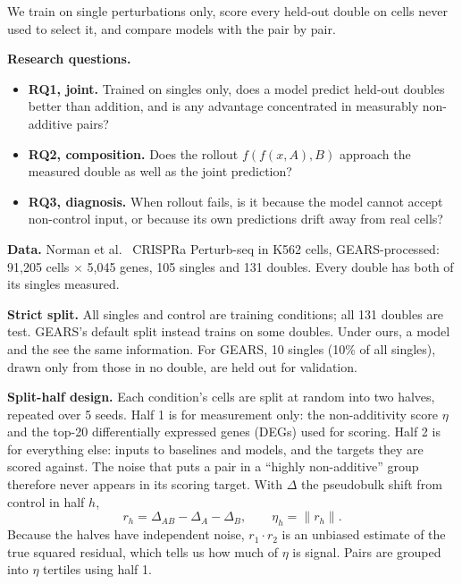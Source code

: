 We train on single perturbations only, score every held-out double on cells never used to
select it, and compare models with the \addnull pair by pair.

\noindent\textbf{Research questions.}
\begin{itemize}[nosep]
  \item \textbf{RQ1, joint.} Trained on singles only, does a model predict held-out doubles
  better than addition, and is any advantage concentrated in measurably non-additive pairs?
  \item \textbf{RQ2, composition.} Does the rollout $f(f(x, A), B)$ approach the measured
  double as well as the joint prediction?
  \item \textbf{RQ3, diagnosis.} When rollout fails, is it because the model cannot accept
  non-control input, or because its own predictions drift away from real cells?
\end{itemize}

\noindent\textbf{Data.} Norman et al.~\cite{norman2019} CRISPRa Perturb-seq in K562 cells,
GEARS-processed: 91,205 cells $\times$ 5,045 genes, 105 singles and 131 doubles. Every
double has both of its singles measured.

\noindent\textbf{Strict split.} All singles and control are training conditions; all 131
doubles are test. GEARS's default split instead trains on some doubles. Under ours, a model
and the \addnull see the same information. For GEARS, 10 singles (10\% of all singles), drawn only from those in no
double, are held out for validation.

\noindent\textbf{Split-half design.} Each condition's cells are split at random into two
halves, repeated over 5 seeds. Half 1 is for measurement only: the non-additivity score
$\eta$ and the top-20 differentially expressed genes (DEGs) used for scoring. Half 2 is for
everything else: inputs to baselines and models, and the targets they are scored against.
The noise that puts a pair in a ``highly non-additive'' group therefore never appears in its
scoring target. With $\Delta$ the pseudobulk shift from control in half $h$,
\begin{equation}
r_h = \Delta_{AB} - \Delta_A - \Delta_B, \qquad \eta_h = \lVert r_h \rVert .
\end{equation}
Because the halves have independent noise, $r_1 \cdot r_2$ is an unbiased estimate of the
true squared residual, which tells us how much of $\eta$ is signal. Pairs are grouped into
$\eta$ tertiles using half 1.

